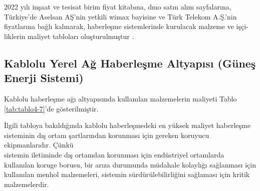 2022 yılı inşaat ve tesisat birim fiyat kitabına, \gls{dmo} satın alım sayfalarına, Türkiye’de Aselsan AŞ’nin yetkili \gls{wimax} bayisine ve Türk Telekom A.Ş.’nin fiyatlarına bağlı kalınarak, haberleşme sistemlerinde kurulacak malzeme ve işçi-liklerin maliyet tabloları oluşturulmuştur \cite{birimfiyat}.




\subsection{Kablolu Yerel Ağ Haberleşme Altyapısı (Güneş Enerji Sistemi)}


Kablolu haberleşme ağı altyapısında kullanılan malzemelerin maliyeti Tablo \ref{tab:tablo4-7}’de gösterilmiştir.

İlgili tabloya bakıldığında kablolu haberleşmedeki en yüksek maliyet haberleşme sisteminin dış ortam şartlarından korunması için gereken koruyucu ekipmanlarıdır. Çünkü\\ sistemin iletiminde dış ortamdan korunması için endüstriyel ortamlarda kullanılan koruge borusu, bir arıza durumunda müdahale kolaylığı sağlanması için kullanılan menhol malzemeleri, sistemin sürdürülebilirliğini sağlaması için kritik malzemelerdir.



